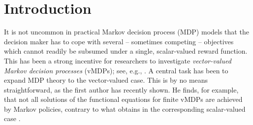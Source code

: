 \documentclass{article}
\theoremstyle{definition}
\numberwithin{equation}{section}
\begin{document}
{%



\section{Introduction}
\label{sect_intro}
It is not uncommon in practical Markov decision process (MDP) models that %
the decision maker has to cope with several -- sometimes competing -- objectives which cannot readily be subsumed under a single, scalar-valued reward function.  %
%
%
This has been a strong incentive for
researchers to investigate \textit{vector-valued Markov decision processes} (vMDPs); see, e.g., \cite{8, 21, 20, 10, 17}.
A central task has been to expand MDP theory to the vector-valued case. This is by no means straightforward, as the first author has recently shown. He finds, for example, that not all solutions of the functional equations for finite vMDPs \cite{21} are achieved by Markov policies, contrary to what obtains in the corresponding scalar-valued case \cite{13}.  
}
\end{document}
